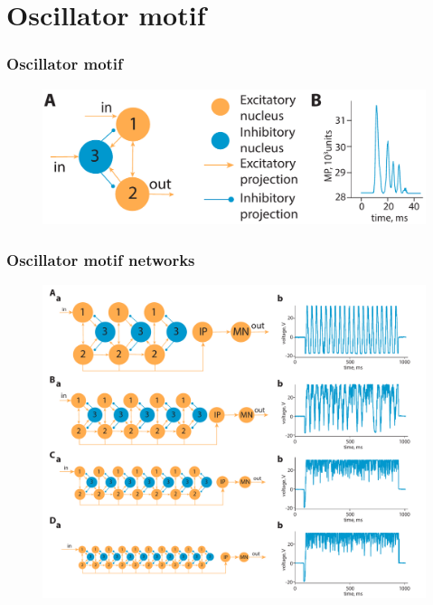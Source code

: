 \documentclass[12pt, aspectratio=169]{beamer}
\begin{document}
\section{Oscillator motif}
\begin{frame}
  \frametitle{Oscillator motif}
  \begin{figure}
    \includegraphics[width=0.8\linewidth]{OM_2}
  \end{figure}
\end{frame}
\begin{frame}
  \frametitle{Oscillator motif networks}
  \begin{figure}
    \includegraphics[width=0.65\linewidth]{OM_osc}
  \end{figure}
\end{frame}

\end{document}
